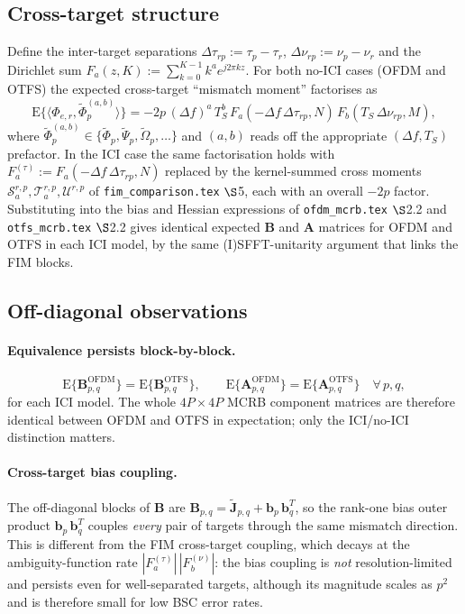\documentclass[11pt]{article}
\begin{document}
\subsection*{Cross-target structure}

Define the inter-target separations \(\Delta\tau_{rp} := \tau_p - \tau_r\), \(\Delta\nu_{rp} := \nu_p - \nu_r\) and the Dirichlet sum \(F_a(z,K) := \sum_{k=0}^{K-1} k^a e^{j2\pi kz}\). For both no-ICI cases (OFDM and OTFS) the expected cross-target ``mismatch moment'' factorises as
\begin{equation}
    \mathrm{E}\{\langle \Phi_{e,r}, \tilde{\Phi}_p^{(a,b)}\rangle\} = -2p\, (\Delta f)^a\, T_S^b\, F_a(-\Delta f\,\Delta\tau_{rp}, N)\, F_b(T_S\,\Delta\nu_{rp}, M),
\end{equation}
where \(\tilde{\Phi}_p^{(a,b)} \in \{\tilde{\Phi}_p, \tilde{\Psi}_p, \tilde{\Omega}_p, \ldots\}\) and \((a,b)\) reads off the appropriate \((\Delta f, T_S)\) prefactor. In the ICI case the same factorisation holds with \(F_a^{(\tau)} := F_a(-\Delta f\,\Delta\tau_{rp},N)\) replaced by the kernel-summed cross moments \(\mathcal{S}_a^{r,p}, \mathcal{T}_a^{r,p}, \mathcal{U}^{r,p}\) of \texttt{fim\_comparison.tex} \(\S\)5, each with an overall \(-2p\) factor. Substituting into the bias and Hessian expressions of \texttt{ofdm\_mcrb.tex} \(\S\)2.2 and \texttt{otfs\_mcrb.tex} \(\S\)2.2 gives identical expected \(\bm{B}\) and \(\bm{A}\) matrices for OFDM and OTFS in each ICI model, by the same (I)SFFT-unitarity argument that links the FIM blocks.

\subsection*{Off-diagonal observations}

\paragraph{Equivalence persists block-by-block.}
\begin{equation}
    \boxed{\;
    \mathrm{E}\{\bm{B}_{p,q}^{\text{OFDM}}\} = \mathrm{E}\{\bm{B}_{p,q}^{\text{OTFS}}\}, \qquad
    \mathrm{E}\{\bm{A}_{p,q}^{\text{OFDM}}\} = \mathrm{E}\{\bm{A}_{p,q}^{\text{OTFS}}\}
    \quad \forall\, p, q,
    \;}
\end{equation}
for each ICI model. The whole \(4P \times 4P\) MCRB component matrices are therefore identical between OFDM and OTFS in expectation; only the ICI/no-ICI distinction matters.

\paragraph{Cross-target bias coupling.} The off-diagonal blocks of \(\bm{B}\) are \(\bm{B}_{p,q} = \tilde{\bm{J}}_{p,q} + \bm{b}_p\, \bm{b}_q^T\), so the rank-one bias outer product \(\bm{b}_p\, \bm{b}_q^T\) couples \emph{every} pair of targets through the same mismatch direction. This is different from the FIM cross-target coupling, which decays at the ambiguity-function rate \(|F_a^{(\tau)}|\,|F_b^{(\nu)}|\): the bias coupling is \emph{not} resolution-limited and persists even for well-separated targets, although its magnitude scales as \(p^2\) and is therefore small for low BSC error rates.
\end{document}
